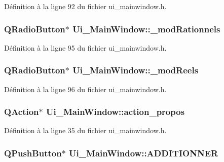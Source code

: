 \-Définition à la ligne 92 du fichier ui\-\_\-mainwindow.\-h.

\hypertarget{class_ui___main_window_a533df173469e3e35768e358b00758ae4}{
\subsubsection[{\-\_\-mod\-Rationnels}]{\setlength{\rightskip}{0pt plus 5cm}\-Q\-Radio\-Button$\ast$ {\bf \-Ui\-\_\-\-Main\-Window\-::\-\_\-mod\-Rationnels}}}\label{class_ui___main_window_a533df173469e3e35768e358b00758ae4}


\-Définition à la ligne 95 du fichier ui\-\_\-mainwindow.\-h.

\hypertarget{class_ui___main_window_a4b3a8bd75eb6ad2a9be60867badc9a41}{
\subsubsection[{\-\_\-mod\-Reels}]{\setlength{\rightskip}{0pt plus 5cm}\-Q\-Radio\-Button$\ast$ {\bf \-Ui\-\_\-\-Main\-Window\-::\-\_\-mod\-Reels}}}\label{class_ui___main_window_a4b3a8bd75eb6ad2a9be60867badc9a41}


\-Définition à la ligne 96 du fichier ui\-\_\-mainwindow.\-h.

\hypertarget{class_ui___main_window_ab5925c132a26c5f1b68712db69a43955}{
\subsubsection[{action\-\_\-propos}]{\setlength{\rightskip}{0pt plus 5cm}\-Q\-Action$\ast$ {\bf \-Ui\-\_\-\-Main\-Window\-::action\-\_\-propos}}}\label{class_ui___main_window_ab5925c132a26c5f1b68712db69a43955}


\-Définition à la ligne 35 du fichier ui\-\_\-mainwindow.\-h.

\hypertarget{class_ui___main_window_a5881999c31ff45cbe8bdb517a8884e3f}{
\subsubsection[{\-A\-D\-D\-I\-T\-I\-O\-N\-N\-E\-R}]{\setlength{\rightskip}{0pt plus 5cm}\-Q\-Push\-Button$\ast$ {\bf \-Ui\-\_\-\-Main\-Window\-::\-A\-D\-D\-I\-T\-I\-O\-N\-N\-E\-R}}}\label{class_ui___main_window_a5881999c31ff45cbe8bdb517a8884e3f}


